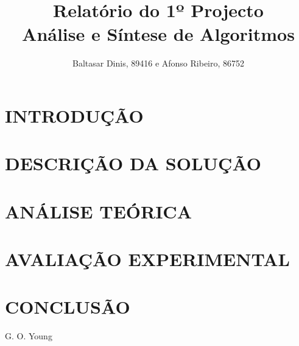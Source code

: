 \documentclass[a4paper, 12pt, conference]{ieeeconf}      %
\title{\LARGE \bf
Relatório do 1º Projecto \\ Análise e Síntese de Algoritmos
}
\author{Baltasar Dinis, 89416 e Afonso Ribeiro, 86752}
\begin{document}
\maketitle
\thispagestyle{empty}
\pagestyle{empty}


\begin{abstract}



\end{abstract}


\section{INTRODUÇÃO}


\section{DESCRIÇÃO DA SOLUÇÃO}

\section{ANÁLISE TEÓRICA}

\section{AVALIAÇÃO EXPERIMENTAL}

\section{CONCLUSÃO}

\begin{thebibliography}{99}

 G. O. Young

\end{thebibliography}
\end{document}
